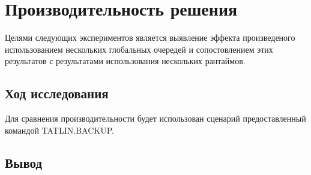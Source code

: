 \section{Производительность решения}

Целями следующих экспериментов является выявление эффекта произведеного использованием нескольких глобальных очередей и сопостовлением этих результатов с результатами использования нескольких рантаймов.

\subsection{Ход исследования}

Для сравнения производительности будет использован сценарий предоставленный командой TATLIN.BACKUP.


\subsection{Вывод}

